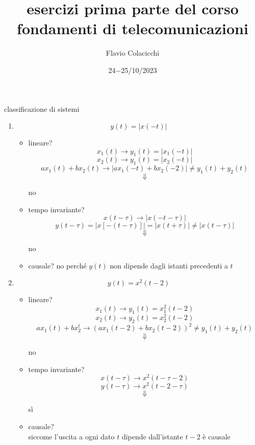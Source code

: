 \documentclass{article}
\title{esercizi prima parte del corso\\\normalsize fondamenti di telecomunicazioni}
\author{Flavio Colacicchi}
\date{24$-$25/10/2023}
\begin{document}
\maketitle 
\begin{center}classificazione di sistemi\end{center}
\begin{enumerate}
    \item \LARGE\[y(t)=|x(-t)|\]\normalsize
        \begin{itemize}
            \item lineare?
                \[x_1(t)\to y_1(t)=|x_1(-t)|\]
                \[x_2(t)\to y_1(t)=|x_2(-t)|\]
                \[ax_1(t)+bx_2(t)\to|ax_1(-t)+bx_2(-2)|\neq y_1(t)+y_2(t)\]
                \[\Downarrow\]
                \begin{center}no\end{center}
            \item tempo invariante?
                \[x(t-\tau)\to|x(-t-\tau)|\]
                \[y(t-\tau)=|x[-(t-\tau)]|=|x(t+\tau)|\neq |x(t-\tau)|\]
                \[\Downarrow\]
                \begin{center}no\end{center}
            \item causale?
                no perché \(y(t)\) non dipende dagli istanti precedenti a \(t\)
        \end{itemize}
        \item \LARGE\[y(t)=x^2(t-2)\]\normalsize
            \begin{itemize}
                \item lineare?
                    \[x_1(t)\to y_1(t)=x_1^2(t-2)\]
                    \[x_2(t)\to y_2(t)=x_2^2(t-2)\]
                    \[ax_1(t)+bx_2^t\to {(ax_1(t-2)+bx_2(t-2))}^2\neq y_1(t)+y_2(t)\]
                    \[\Downarrow\]
                    \begin{center}no\end{center}
                \item tempo invariante?
                    \[x(t-\tau)\to x^2(t-\tau-2)\]
                    \[y(t-\tau)\to x^2(t-2-\tau)\]
                    \[\Downarrow\]
                    \begin{center}sì\end{center}
                \item causale?\\
                    siccome l'uscita a ogni dato \(t\) dipende dall'istante \(t-2\) è causale
            \end{itemize}

\end{enumerate}
\end{document}
